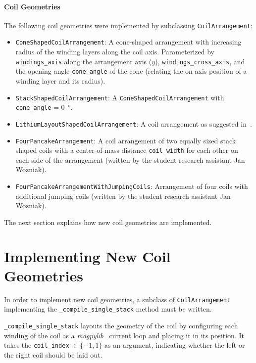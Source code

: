 \paragraph*{Coil Geometries}
The following coil geometries were implemented by subclassing \texttt{CoilArrangement}:
\begin{itemize}
    \item \texttt{ConeShapedCoilArrangement}: A cone-shaped arrangement with increasing radius of the winding layers along the coil axis. Parameterized by \texttt{windings\_axis} along the arrangement axis ($y$), \texttt{windings\_cross\_axis}, and the opening angle \texttt{cone\_angle} of the cone (relating the on-axis position of a winding layer and its radius).
    \item \texttt{StackShapedCoilArrangement}: A \texttt{ConeShapedCoilArrangement} with \texttt{cone\_angle} = \SI[]{0}{\degree}.
    \item \texttt{LithiumLayoutShapedCoilArrangement}: A coil arrangement as suggested in~\cite{gantner_magnetic_2012}.
    \item \texttt{FourPancakeArrangement}: A coil arrangement of two equally sized stack shaped coils with a center-of-mass distance \texttt{coil\_width} for each other on each side of the arrangement (written by the student research assistant Jan Wozniak).
    \item \texttt{FourPancakeArrangementWithJumpingCoils}: Arrangement of four coils with additional jumping coils (written by the student research assistant Jan Wozniak).
\end{itemize}
The next section explains how new coil geometries are implemented.

\section*{Implementing New Coil Geometries}
In order to implement new coil geometries, a subclass of \texttt{CoilArrangement} implementing the \texttt{\_compile\_single\_stack} method must be written.

\texttt{\_compile\_single\_stack} layouts the geometry of the coil by configuring each winding of the coil as a \textit{magpylib}~\cite{noauthor_magpylibmagpylib_nodate} current loop and placing it in its position. It takes the \texttt{coil\_index} $\in \{-1, 1\}$ as an argument, indicating whether the left or the right coil should be laid out.

